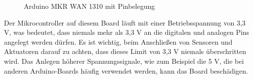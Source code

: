 \begin{figure}[H]
	\centering
	\caption{Arduino MKR WAN 1310 mit Pinbelegung}
	\label{fig:arduinoMkrWan}
\end{figure}

Der Mikrocontroller auf diesem Board läuft mit einer Betriebsspannung von 3,3 V, was bedeutet, dass niemals mehr als 3,3 V an die digitalen und analogen Pins angelegt werden dürfen. Es ist wichtig, beim Anschließen von Sensoren und Aktuatoren darauf zu achten, dass dieses Limit von 3,3 V niemals überschritten wird. Das Anlegen höherer Spannungssignale, wie zum Beispiel die 5 V, die bei anderen Arduino-Boards häufig verwendet werden, kann das Board beschädigen.


%
%
%
%
%

